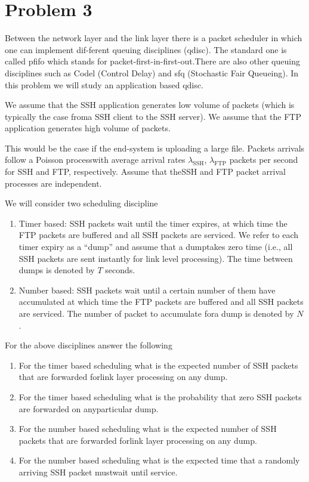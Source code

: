 
\section*{Problem 3}

Between the network layer and the link layer there is a packet scheduler in which one can implement dif-ferent queuing disciplines (qdisc).
The standard one is called pfifo which stands for packet-first-in-first-out.There are also other queuing disciplines such as Codel (Control Delay) and sfq (Stochastic Fair Queueing).
In this problem we will study an application based qdisc.

We assume that the SSH application generates low volume of packets (which is typically the case froma SSH client to the SSH server).
We assume that the FTP application generates high volume of packets.

This would be the case if the end-system is uploading a large file.
Packets arrivals follow a Poisson processwith average arrival rates $\lambda_{\text{SSH}}$, $\lambda_{\text{FTP}}$ packets per second for SSH and FTP, respectively.
Assume that theSSH and FTP packet arrival processes are independent.

We will consider two scheduling discipline

\begin{enumerate}
    \item Timer based:  SSH packets wait until the timer expires, at which time the FTP packets are buffered and all SSH packets are serviced.
          We refer to each timer expiry as a ``dump'' and assume that a dumptakes zero time (i.e., all SSH packets are sent instantly for link level processing).
          The time between dumps is denoted by $T$ seconds.
    \item Number based: SSH packets wait until a certain number of them have accumulated at which time the FTP packets are buffered and all SSH packets are serviced.
          The number of packet to accumulate fora dump is denoted by $N$.
\end{enumerate}

For the above disciplines answer the following

\begin{enumerate}
    \item For the timer based scheduling what is the expected number of SSH packets that are forwarded forlink layer processing on any dump.
    \item For the timer based scheduling what is the probability that zero SSH packets are forwarded on anyparticular dump.
    \item For the number based scheduling what is the expected number of SSH packets that are forwarded forlink layer processing on any dump.
    \item For the number based scheduling what is the expected time that a randomly arriving SSH packet mustwait until service.
\end{enumerate}
